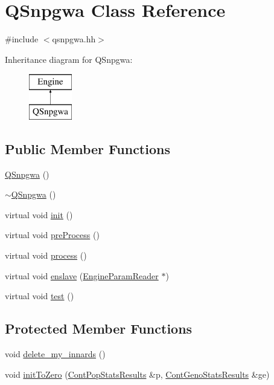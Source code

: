 \hypertarget{classQSnpgwa}{
\section{QSnpgwa Class Reference}
\label{classQSnpgwa}
}


{\ttfamily \#include $<$qsnpgwa.hh$>$}

Inheritance diagram for QSnpgwa:\begin{figure}[H]
\begin{center}
\leavevmode
\includegraphics[height=2cm]{classQSnpgwa}
\end{center}
\end{figure}
\subsection*{Public Member Functions}
\begin{DoxyCompactItemize}
\item 
\hyperlink{classQSnpgwa_a348176fb642698c7756df9039b77109f}{QSnpgwa} ()
\item 
\hyperlink{classQSnpgwa_a762e315fb2455be5a553083af082b07d}{$\sim$QSnpgwa} ()
\item 
virtual void \hyperlink{classQSnpgwa_ac228fcbfcba981d48a223e911673e406}{init} ()
\item 
virtual void \hyperlink{classQSnpgwa_acc9e7d7e48d9c3e2fbb0a75e263f0c50}{preProcess} ()
\item 
virtual void \hyperlink{classQSnpgwa_a4873c7584d427c41a01e1bba159cf486}{process} ()
\item 
virtual void \hyperlink{classQSnpgwa_a2c39271b1001005e6d5a451dbc2fd8bb}{enslave} (\hyperlink{classEngineParamReader}{EngineParamReader} $\ast$)
\item 
virtual void \hyperlink{classQSnpgwa_aa127cdd0a042058f1ecab33d831a58a6}{test} ()
\end{DoxyCompactItemize}
\subsection*{Protected Member Functions}
\begin{DoxyCompactItemize}
\item 
void \hyperlink{classQSnpgwa_a30919016fc64635fcf65ca8771af504b}{delete\_\-my\_\-innards} ()
\item 
void \hyperlink{classQSnpgwa_a882fa04dd74b9772bbd452d5acc0dfb8}{initToZero} (\hyperlink{structContPopStatsResults}{ContPopStatsResults} \&p, \hyperlink{structContGenoStatsResults}{ContGenoStatsResults} \&ge)
\end{DoxyCompactItemize}
